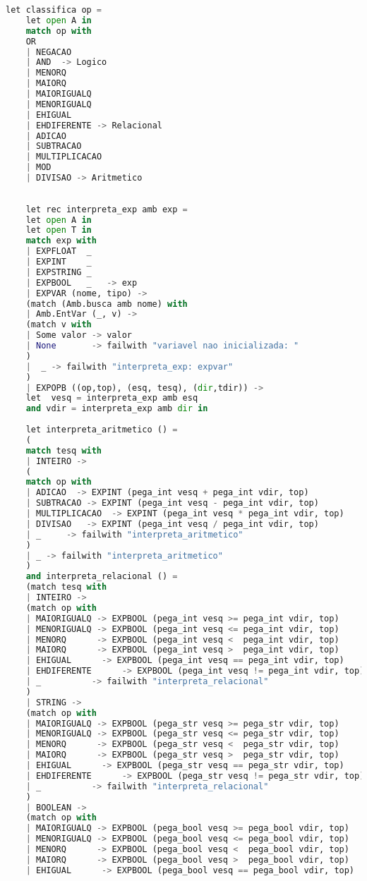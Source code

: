 \documentclass[hidelinks,12pt]{article}
\begin{document}
\begin{appendices}
\begin{lstlisting}[caption=interprete.mll, language=python]
	let classifica op =
	let open A in
	match op with
	OR
	| NEGACAO
	| AND  -> Logico
	| MENORQ
	| MAIORQ
	| MAIORIGUALQ
	| MENORIGUALQ
	| EHIGUAL
	| EHDIFERENTE -> Relacional
	| ADICAO
	| SUBTRACAO
	| MULTIPLICACAO
	| MOD
	| DIVISAO -> Aritmetico
	
	
	let rec interpreta_exp amb exp =
	let open A in
	let open T in
	match exp with
	| EXPFLOAT  _
	| EXPINT    _
	| EXPSTRING _
	| EXPBOOL   _   -> exp
	| EXPVAR (nome, tipo) ->
	(match (Amb.busca amb nome) with
	| Amb.EntVar (_, v) ->
	(match v with
	| Some valor -> valor
	| None       -> failwith "variavel nao inicializada: "
	)
	|  _ -> failwith "interpreta_exp: expvar"
	)  
	| EXPOPB ((op,top), (esq, tesq), (dir,tdir)) ->
	let  vesq = interpreta_exp amb esq
	and vdir = interpreta_exp amb dir in
	
	let interpreta_aritmetico () =
	(
	match tesq with
	| INTEIRO ->
	(
	match op with
	| ADICAO  -> EXPINT (pega_int vesq + pega_int vdir, top)
	| SUBTRACAO -> EXPINT (pega_int vesq - pega_int vdir, top)
	| MULTIPLICACAO  -> EXPINT (pega_int vesq * pega_int vdir, top)
	| DIVISAO   -> EXPINT (pega_int vesq / pega_int vdir, top)
	| _     -> failwith "interpreta_aritmetico"
	)
	| _ -> failwith "interpreta_aritmetico"
	)
	and interpreta_relacional () =
	(match tesq with
	| INTEIRO ->
	(match op with
	| MAIORIGUALQ -> EXPBOOL (pega_int vesq >= pega_int vdir, top)
	| MENORIGUALQ -> EXPBOOL (pega_int vesq <= pega_int vdir, top)
	| MENORQ      -> EXPBOOL (pega_int vesq <  pega_int vdir, top)
	| MAIORQ      -> EXPBOOL (pega_int vesq >  pega_int vdir, top)
	| EHIGUAL      -> EXPBOOL (pega_int vesq == pega_int vdir, top)
	| EHDIFERENTE      -> EXPBOOL (pega_int vesq != pega_int vdir, top)
	| _          -> failwith "interpreta_relacional"
	)
	| STRING ->
	(match op with
	| MAIORIGUALQ -> EXPBOOL (pega_str vesq >= pega_str vdir, top)
	| MENORIGUALQ -> EXPBOOL (pega_str vesq <= pega_str vdir, top)
	| MENORQ      -> EXPBOOL (pega_str vesq <  pega_str vdir, top)
	| MAIORQ      -> EXPBOOL (pega_str vesq >  pega_str vdir, top)
	| EHIGUAL      -> EXPBOOL (pega_str vesq == pega_str vdir, top)
	| EHDIFERENTE      -> EXPBOOL (pega_str vesq != pega_str vdir, top)
	| _          -> failwith "interpreta_relacional"
	)
	| BOOLEAN ->
	(match op with
	| MAIORIGUALQ -> EXPBOOL (pega_bool vesq >= pega_bool vdir, top)
	| MENORIGUALQ -> EXPBOOL (pega_bool vesq <= pega_bool vdir, top)
	| MENORQ      -> EXPBOOL (pega_bool vesq <  pega_bool vdir, top)
	| MAIORQ      -> EXPBOOL (pega_bool vesq >  pega_bool vdir, top)
	| EHIGUAL      -> EXPBOOL (pega_bool vesq == pega_bool vdir, top)

\end{lstlisting}
\end{appendices}
\end{document}
